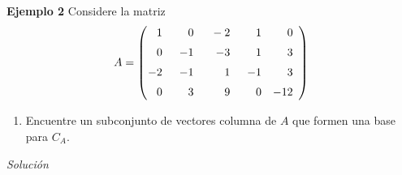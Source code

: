 \begin{frame}%
	
	\begin{ej}{\textbf{Ejemplo 2}}
		Considere la matriz
		\[
		A = 
		\left( 
		\begin{array}{@{\hspace{0.1\tabcolsep}}rrrrr}	
		1 & \phantom{-1}0 & \phantom{1}-2 & \phantom{-1}1 & 0 \\[2mm] 
		0 & -1 & -3 & 1 & 3 \\[2mm] 
		-2 & -1 & 1 & -1 & 3 \\[2mm] 
		0 & 3 & 9 & 0 & -12 
		\end{array} 
		\right)
		\]
		
		\vspace{-1mm}	
		\begin{enumerate}
			\item[\labelname{$b$}] Encuentre un subconjunto de vectores columna de $A$ que formen una base para $C_A$.\\[2mm]
		\end{enumerate}
	\end{ej}
	\textit{Solución}
	
\end{frame}


\subsection{}

